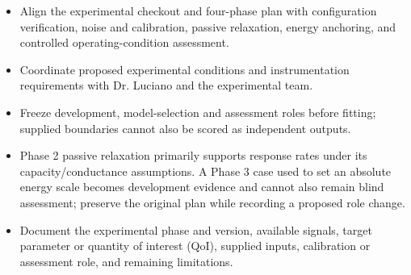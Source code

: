 \begin{itemize}[leftmargin=*]
\item Align the experimental checkout and four-phase plan with configuration verification, noise and calibration, passive relaxation, energy anchoring, and controlled operating-condition assessment.
\item Coordinate proposed experimental conditions and instrumentation requirements with Dr. Luciano and the experimental team.
\item Freeze development, model-selection and assessment roles before fitting; supplied boundaries cannot also be scored as independent outputs.
\item Phase 2 passive relaxation primarily supports response rates under its capacity/\allowbreak{}conductance assumptions. A Phase 3 case used to set an absolute energy scale becomes development evidence and cannot also remain blind assessment; preserve the original plan while recording a proposed role change.
\item Document the experimental phase and version, available signals, target parameter or quantity of interest (QoI), supplied inputs, calibration or assessment role, and remaining limitations.


\end{itemize}
